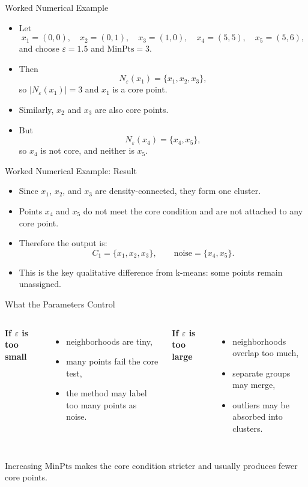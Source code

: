 \begin{frame}{Worked Numerical Example}
\small
\begin{itemize}
  \item Let
  \[
    x_1=(0,0),\quad x_2=(0,1),\quad x_3=(1,0),\quad x_4=(5,5),\quad x_5=(5,6),
  \]
  and choose $\varepsilon = 1.5$ and $\text{MinPts}=3$.
  \pause
  \item Then
  \[
    N_\varepsilon(x_1)=\{x_1,x_2,x_3\},
  \]
  so $|N_\varepsilon(x_1)|=3$ and $x_1$ is a core point.
  \pause
  \item Similarly, $x_2$ and $x_3$ are also core points.
  \pause
  \item But
  \[
    N_\varepsilon(x_4)=\{x_4,x_5\},
  \]
  so $x_4$ is not core, and neither is $x_5$.
\end{itemize}
\end{frame}

\begin{frame}{Worked Numerical Example: Result}
\small
\begin{itemize}
  \item Since $x_1$, $x_2$, and $x_3$ are density-connected, they form one cluster.
  \pause
  \item Points $x_4$ and $x_5$ do not meet the core condition and are not attached to any core point.
  \pause
  \item Therefore the output is:
  \[
    C_1 = \{x_1,x_2,x_3\},
    \qquad
    \text{noise} = \{x_4,x_5\}.
  \]
  \pause
  \item This is the key qualitative difference from k-means: some points remain unassigned.
\end{itemize}
\end{frame}

\begin{frame}{What the Parameters Control}
\begin{columns}[T]
\textbf{If $\varepsilon$ is too small}
\begin{itemize}
  \item neighborhoods are tiny,
  \pause
  \item many points fail the core test,
  \pause
  \item the method may label too many points as noise.
\end{itemize}

\pause
{}
\textbf{If $\varepsilon$ is too large}
\begin{itemize}
  \item neighborhoods overlap too much,
  \pause
  \item separate groups may merge,
  \pause
  \item outliers may be absorbed into clusters.
\end{itemize}
\end{columns}

\pause
\vspace{0.35em}
\footnotesize Increasing $\text{MinPts}$ makes the core condition stricter and usually produces fewer core points.
\end{frame}

